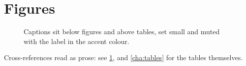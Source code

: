 \section{Figures}

\begin{figure}[htbp]
  \centering
  \caption{Captions sit below figures and above tables, set small and muted
    with the label in the accent colour.}
  \label{fig:placeholder}
\end{figure}

Cross-references read as prose: see \cref{fig:placeholder}, and
\cref{cha:tables} for the tables themselves.
\label{cha:tables}

